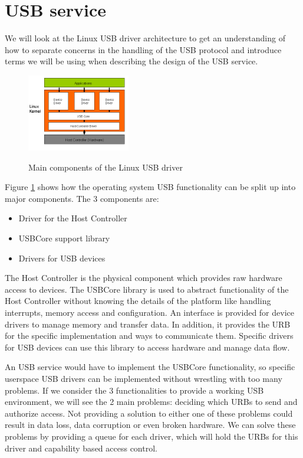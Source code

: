 \documentclass{acm_proc_article-sp}
\begin{document}
\section{USB service}
\label{sec:serv}
We will look at the Linux USB driver architecture to get an understanding of how to separate concerns
in the handling of the USB protocol and introduce terms we will be using when describing the design
of the USB service.
\begin{figure}
\centering
\includegraphics[width=0.4\textwidth]{usblinux.png}
\label{fig:usblinux}
\caption{Main components of the Linux USB driver}
\end{figure}
Figure \ref{fig:usblinux} shows how the operating system USB functionality can be split up into
major components.
The 3 components are:
\begin{itemize}
\item Driver for the Host Controller
\item USBCore support library
\item Drivers for USB devices
\end{itemize}
The Host Controller is the physical component which provides raw hardware access to devices.
The USBCore library is used to abstract functionality of the Host Controller without knowing
the details of the platform like handling interrupts, memory access and configuration.
An interface is provided for device drivers to manage memory and transfer data.
In addition, it provides the URB for the specific implementation and ways to communicate them.
Specific drivers for USB devices can use this library to access hardware and manage data flow.

An USB service would have to implement the USBCore functionality, so specific userspace
USB drivers can be implemented without wrestling with too many problems.
If we consider the 3 functionalities to provide a working USB environment, we will see the 2
main problems: deciding which URBs to send and authorize access.
Not providing a solution to either one of these problems could result in data loss,
data corruption or even broken hardware.
We can solve these problems by providing a queue for each driver, which will hold the URBs
for this driver and capability based access control.
\end{document}
